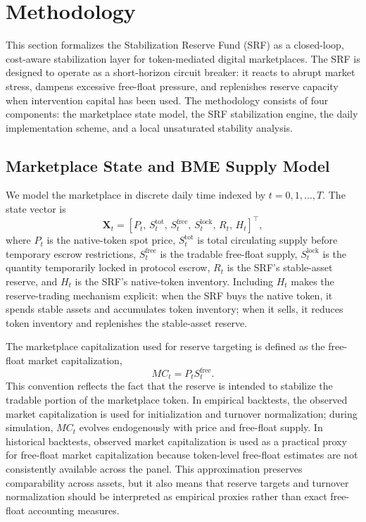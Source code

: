 \documentclass[a4paper,fleqn]{cas-dc}
\begin{document}
\section{Methodology}
\label{sec:methodology}

This section formalizes the Stabilization Reserve Fund (SRF) as a closed-loop, cost-aware stabilization layer for token-mediated digital marketplaces. The SRF is designed to operate as a short-horizon circuit breaker: it reacts to abrupt market stress, dampens excessive free-float pressure, and replenishes reserve capacity when intervention capital has been used. The methodology consists of four components: the marketplace state model, the SRF stabilization engine, the daily implementation scheme, and a local unsaturated stability analysis.

\subsection{Marketplace State and BME Supply Model}
\label{subsec:state_model}

We model the marketplace in discrete daily time indexed by $t=0,1,\ldots,T$. The state vector is
\begin{equation}
\mathbf{X}_t =
\left[
P_t,\,
S_t^{\mathrm{tot}},\,
S_t^{\mathrm{free}},\,
S_t^{\mathrm{lock}},\,
R_t,\,
H_t
\right]^{\top},
\label{eq:state_vector}
\end{equation}
where $P_t$ is the native-token spot price, $S_t^{\mathrm{tot}}$ is total circulating supply before temporary escrow restrictions, $S_t^{\mathrm{free}}$ is the tradable free-float supply, $S_t^{\mathrm{lock}}$ is the quantity temporarily locked in protocol escrow, $R_t$ is the SRF's stable-asset reserve, and $H_t$ is the SRF's native-token inventory. Including $H_t$ makes the reserve-trading mechanism explicit: when the SRF buys the native token, it spends stable assets and accumulates token inventory; when it sells, it reduces token inventory and replenishes the stable-asset reserve.

The marketplace capitalization used for reserve targeting is defined as the free-float market capitalization,
\begin{equation}
MC_t = P_t S_t^{\mathrm{free}}.
\label{eq:market_cap}
\end{equation}
This convention reflects the fact that the reserve is intended to stabilize the tradable portion of the marketplace token. In empirical backtests, the observed market capitalization is used for initialization and turnover normalization; during simulation, $MC_t$ evolves endogenously with price and free-float supply. In historical backtests, observed market capitalization is used as a practical proxy for free-float market capitalization because token-level free-float estimates are not consistently available across the panel. This approximation preserves comparability across assets, but it also means that reserve targets and turnover normalization should be interpreted as empirical proxies rather than exact free-float accounting measures.
\end{document}
